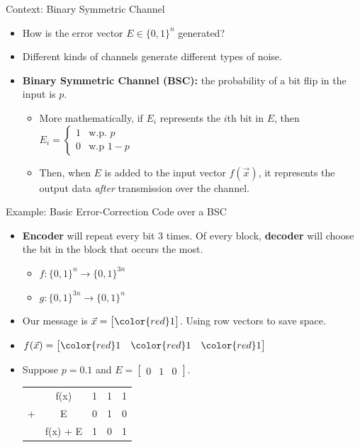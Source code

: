 \documentclass[aspectratio=169]{beamer}
\newcommand{\re}{\color{red}}
\begin{document}
\begin{frame}{Context: Binary Symmetric Channel}
  \begin{itemize}
      \item How is the error vector $E \in \{0, 1\}^{n}$ generated?
      \item Different kinds of channels generate different types of noise.
      \item \textbf{Binary Symmetric Channel (BSC):} the probability of a bit flip in the input is $p$.
          \begin{itemize}
                  \item More mathematically, if $E_{i}$ represents the $i$th bit in $E$, then \( E_{i} = \begin{cases} 1 & \text{w.p. $p$} \\ 0 & \text{w.p $1-p$}\end{cases}\)
                  \item Then, when $E$ is added to the input vector $f(\vec{x})$, it represents the output data \textit{after} transmission over the channel.
            \end{itemize}
    \end{itemize}
\end{frame}


\begin{frame}{Example: Basic Error-Correction Code over a BSC}
\begin{itemize}
  \item \textbf{Encoder} will repeat every bit $3$ times. Of every block, \textbf{decoder} will choose the bit in the block that occurs the most.
  \begin{itemize}
          \item $f: \{0, 1\}^{n} \to \{0, 1\}^{3n}$
          \item $g: \{0, 1\}^{3n} \to \{0, 1\}^{n}$
    \end{itemize}
  \item Our message is \(\vec{x} = \begin{bmatrix} \re1 \end{bmatrix}\). Using row vectors to save space.
  \item \(f(\vec{x}) = \begin{bmatrix} \re1 & \re1 & \re1 \end{bmatrix}\)
  \item Suppose $p = 0.1$ and \(E = \begin{bmatrix} 0 & 1 & 0\end{bmatrix}\). \\ \begin{tabular}{ccccc}
            & f(x)     & \re1 & \re1 & \re1\\
          + & E        & 0 & 1 & 0\\
          \hline
            & f(x) + E & \re1 & \re0 & \re1
          \end{tabular}

\end{itemize}
\end{frame}
\end{document}
